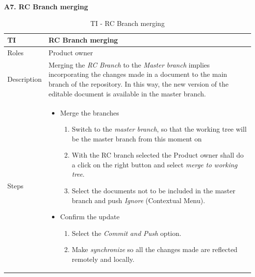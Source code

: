 \documentclass{template/openetcs_article}
\begin{document}
\textbf{A7. RC Branch merging}
\begin{table}[H]
\begin{tabular}{|m{2cm}|m{12cm}|}
\hline
\rowcolor{myblue}
TI & 
RC Branch merging
\\\hline
Roles &
Product owner
\\\hline
Description &
Merging the {\it RC Branch} to the {\it Master branch} implies incorporating the changes made in a document to the main branch of the repository. In this way, the new version of the editable document is available in the master branch.
\\\hline
Steps &
\begin{itemize}
\item Merge the branches 
\begin{enumerate}
\item Switch to the {\it master branch}, so that the working tree will be the master branch from this moment on
\item With the RC branch selected the Product owner shall do a click on the right button and select {\it merge to working tree}.
\item Select the documents not to be included in the master branch and push {\it Ignore} (Contextual Menu).
\end{enumerate}
\item Confirm the update
\begin{enumerate}
\item Select the {\it Commit and Push} option.
\item Make {\it synchronize} so all the changes made are reflected remotely and locally.
\end{enumerate}
\end{itemize}
\\\hline
\end{tabular}
\caption{TI - RC Branch merging}
\end{table}
\end{document}

